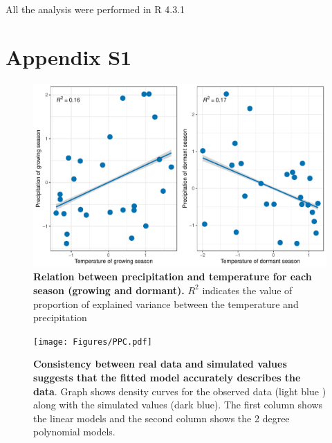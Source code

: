 \documentclass[11pt]{article}
\begin{document}
{All the analysis were performed in R 4.3.1 \citep{RCoreteam}


\section*{Appendix S1}
\renewcommand{\thefigure}{S\arabic{figure}}
	\setcounter{figure}{0}
	
		\renewcommand{\thetable}{S\arabic{table}}
	\setcounter{equation}{0}  %
	\setcounter{figure}{0}
	\setcounter{table}{0}
	
	
	\begin{figure}[H]
		\centering
		\includegraphics[width = \linewidth]{Figures/Varianceexplained.pdf}
		\caption{\textbf{Relation between precipitation and temperature for each season (growing and dormant).} $R^2$ indicates the value of proportion of explained variance between the temperature and precipitation}
	\end{figure}
	
  \begin{figure}[H]
		\centering
		\texttt{[image: Figures/PPC.pdf]}
		\caption{\textbf{Consistency between real data and simulated values suggests that the fitted model accurately describes the data}. Graph shows density curves for the observed data (light blue ) along with the simulated values (dark blue). The first column shows the linear models and the second column shows the 2 degree polynomial models.}
	\end{figure}

}
\end{document}
